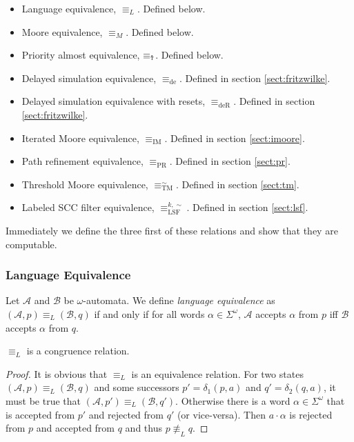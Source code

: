 \begin{itemize}
	\item Language equivalence, $\equiv_L$. Defined below.
	\item Moore equivalence, $\equiv_M$. Defined below.
	\item Priority almost equivalence, $\equiv_\text{\Ankh}$. Defined below.
	\item Delayed simulation equivalence, $\equiv_\text{de}$. Defined in section \ref{sect:fritzwilke}.
	\item Delayed simulation equivalence with resets, $\equiv_\text{deR}$. Defined in section \ref{sect:fritzwilke}.
	\item Iterated Moore equivalence, $\equiv_\text{IM}$. Defined in section \ref{sect:imoore}.
	\item Path refinement equivalence, $\equiv_\text{PR}$. Defined in section \ref{sect:pr}.
	\item Threshold Moore equivalence, $\equiv_\text{TM}^\sim$. Defined in section \ref{sect:tm}.
	\item Labeled SCC filter equivalence, $\equiv_\text{LSF}^{k,\sim}$. Defined in section \ref{sect:lsf}.
\end{itemize}

Immediately we define the three first of these relations and show that they are computable.

\vspace{5pt}

\subsubsection{Language Equivalence}

\begin{defn}
	Let $\mathcal{A}$ and $\mathcal{B}$ be $\omega$-automata. We define \emph{language equivalence} as $(\mathcal{A}, p) \equiv_L (\mathcal{B}, q)$ if and only if for all words $\alpha \in \Sigma^\omega$, $\mathcal{A}$ accepts $\alpha$ from $p$ iff $\mathcal{B}$ accepts $\alpha$ from $q$.
\end{defn}

\begin{lem}
	$\equiv_L$ is a congruence relation.
	\label{lem:general:L_congruence}
\end{lem}

\begin{proof}
	It is obvious that $\equiv_L$ is an equivalence relation. For two states $(\mathcal{A}, p) \equiv_L (\mathcal{B}, q)$ and some successors $p' = \delta_1(p, a)$ and $q' = \delta_2(q, a)$, it must be true that $(\mathcal{A}, p') \equiv_L (\mathcal{B}, q')$. Otherwise there is a word $\alpha \in \Sigma^\omega$ that is accepted from $p'$ and rejected from $q'$ (or vice-versa). Then $a \cdot \alpha$ is rejected from $p$ and accepted from $q$ and thus $p \not\equiv_L q$.
\end{proof}

